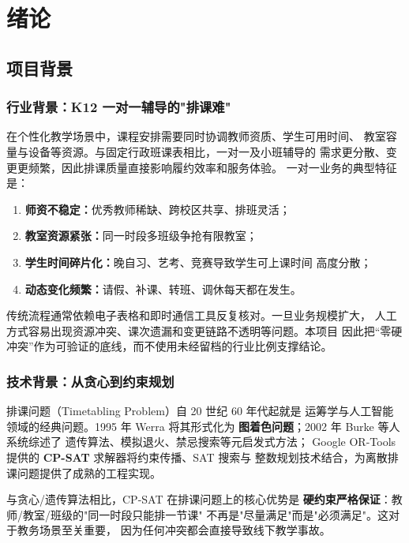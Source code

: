 \section{绪\quad 论}

\subsection{项目背景}

\subsubsection{行业背景：K12 一对一辅导的"排课难"}

在个性化教学场景中，课程安排需要同时协调教师资质、学生可用时间、
教室容量与设备等资源。与固定行政班课表相比，一对一及小班辅导的
需求更分散、变更更频繁，因此排课质量直接影响履约效率和服务体验。
一对一业务的典型特征是：

\begin{enumerate}[leftmargin=2em,itemsep=0.2em]
\item \textbf{师资不稳定：}优秀教师稀缺、跨校区共享、排班灵活；
\item \textbf{教室资源紧张：}同一时段多班级争抢有限教室；
\item \textbf{学生时间碎片化：}晚自习、艺考、竞赛导致学生可上课时间
高度分散；
\item \textbf{动态变化频繁：}请假、补课、转班、调休每天都在发生。
\end{enumerate}

传统流程通常依赖电子表格和即时通信工具反复核对。一旦业务规模扩大，
人工方式容易出现资源冲突、课次遗漏和变更链路不透明等问题。本项目
因此把“零硬冲突”作为可验证的底线，而不使用未经留档的行业比例支撑结论。

\subsubsection{技术背景：从贪心到约束规划}

排课问题（Timetabling Problem）自 20 世纪 60 年代起就是
运筹学与人工智能领域的经典问题。1995 年 Werra 将其形式化为
\textbf{图着色问题}；2002 年 Burke 等人系统综述了
遗传算法、模拟退火、禁忌搜索等元启发式方法；
Google OR-Tools 提供的 \textbf{CP-SAT} 求解器将约束传播、SAT 搜索与
整数规划技术结合，为离散排课问题提供了成熟的工程实现。

与贪心/遗传算法相比，CP-SAT 在排课问题上的核心优势是
\textbf{硬约束严格保证}：教师/教室/班级的"同一时段只能排一节课"
不再是"尽量满足"而是"必须满足"。这对于教务场景至关重要，
因为任何冲突都会直接导致线下教学事故。

